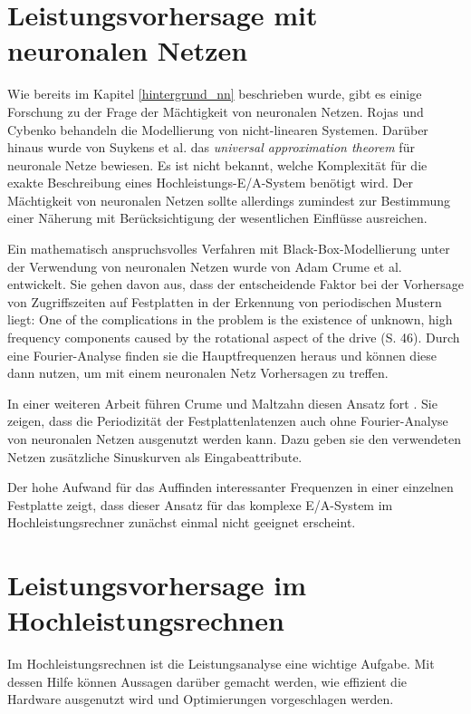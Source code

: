 \documentclass[
	12pt,
	a4paper,
	BCOR10mm,
	DIV14,
	listof=totoc,
	bibliography=totoc,
	headsepline
]{scrreprt}
\begin{document}
\section{Leistungsvorhersage mit neuronalen Netzen}
\label{rel_vorhersage-mit-nn}
Wie bereits im Kapitel \ref{hintergrund_nn} beschrieben wurde, gibt es einige Forschung zu der Frage der Mächtigkeit von neuronalen Netzen. Rojas \cite{Rojas:1996:NNS:235222} und  Cybenko \cite{cybenko:mcss} behandeln die Modellierung von nicht-linearen Systemen. Darüber hinaus wurde von Suykens et al. \cite{suykens2012artificial} das \textit{universal approximation theorem} für neuronale Netze bewiesen. Es ist nicht bekannt, welche Komplexität für die exakte Beschreibung eines Hochleistungs-E/A-System benötigt wird. Der Mächtigkeit von neuronalen Netzen sollte allerdings zumindest zur Bestimmung einer Näherung mit Berücksichtigung der wesentlichen Einflüsse ausreichen.

Ein mathematisch anspruchsvolles Verfahren mit Black-Box-Modellierung unter der Verwendung von neuronalen Netzen wurde von Adam Crume et al. \cite{Crume:2013:FML:2538542.2538561} entwickelt. Sie gehen davon aus, dass der entscheidende Faktor bei der Vorhersage von Zugriffszeiten auf Festplatten in der Erkennung von periodischen Mustern liegt: \glqq One of the complications in the problem is the existence of unknown, high frequency components caused by the rotational aspect of the drive\grqq{} \cite{Crume:2013:FML:2538542.2538561} (S. 46).
Durch eine Fourier-Analyse finden sie die Hauptfrequenzen heraus und können diese dann nutzen, um mit einem neuronalen Netz Vorhersagen zu treffen.

In einer weiteren Arbeit führen Crume und Maltzahn diesen Ansatz fort \cite{crumeadammaltzahncarlos2015}. Sie zeigen, dass die Periodizität der Festplattenlatenzen auch ohne Fourier-Analyse von neuronalen Netzen ausgenutzt werden kann. Dazu geben sie den verwendeten Netzen zusätzliche Sinuskurven als Eingabeattribute.

Der hohe Aufwand für das Auffinden interessanter Frequenzen in einer einzelnen Festplatte zeigt, dass dieser Ansatz für das komplexe E/A-System im Hochleistungsrechner zunächst einmal nicht geeignet erscheint.

\section{Leistungsvorhersage im Hochleistungsrechnen}
\label{rel_vorhersage_im-hpc}
Im Hochleistungsrechnen ist die Leistungsanalyse eine wichtige Aufgabe. Mit dessen Hilfe können Aussagen darüber gemacht werden, wie effizient die Hardware ausgenutzt wird und Optimierungen vorgeschlagen werden. 
\end{document}
